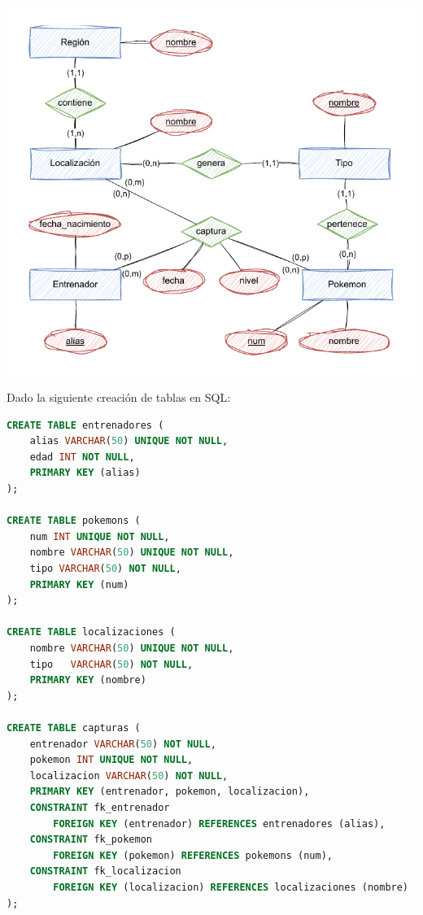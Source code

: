 \documentclass[
    12pt,
    a4paper,
    addpoints,
    answers,
    convocatoria=ext,
    titulacion=CD,
    curso=2023/2024,
]{db-exam}
\begin{document}
\begin{questions}
\begin{parts}
\begin{solution}
\begin{center}
\includegraphics[width=.8\textwidth]{figs/bbdd-cdia-2023-2024-extraordinaria/2024-extraordinaria-gcdia-mer.pdf}
\end{center}
\end{solution}
\end{parts}


\newpage
{}

Dado la siguiente creación de tablas en SQL:

\begin{lstlisting}[language=sql]
CREATE TABLE entrenadores (
    alias VARCHAR(50) UNIQUE NOT NULL,
    edad INT NOT NULL,
    PRIMARY KEY (alias)
);

CREATE TABLE pokemons (
    num INT UNIQUE NOT NULL,
    nombre VARCHAR(50) UNIQUE NOT NULL,
    tipo VARCHAR(50) NOT NULL,
    PRIMARY KEY (num)
);

CREATE TABLE localizaciones (
    nombre VARCHAR(50) UNIQUE NOT NULL,
    tipo   VARCHAR(50) NOT NULL,
    PRIMARY KEY (nombre)
);

CREATE TABLE capturas (
    entrenador VARCHAR(50) NOT NULL,
    pokemon INT UNIQUE NOT NULL,
    localizacion VARCHAR(50) NOT NULL,
    PRIMARY KEY (entrenador, pokemon, localizacion),
    CONSTRAINT fk_entrenador 
        FOREIGN KEY (entrenador) REFERENCES entrenadores (alias),
    CONSTRAINT fk_pokemon 
        FOREIGN KEY (pokemon) REFERENCES pokemons (num),
    CONSTRAINT fk_localizacion 
        FOREIGN KEY (localizacion) REFERENCES localizaciones (nombre)
);
\end{lstlisting}


\end{questions}
\end{document}

